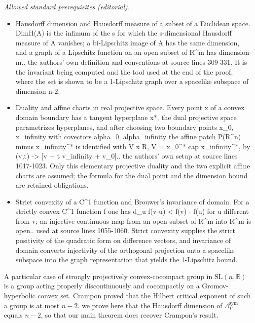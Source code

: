 \documentclass[10pt,a4paper]{amsart}
\newcommand{\sym}{\mathrm{sym}}
\theoremstyle{definition}
\newcommand{\R}{\mathbb{R}}
\newcommand{\SL}{\mathrm{SL}}
\begin{document}
\noindent\textit{Allowed standard prerequisites (editorial).}\begin{itemize}
\item Hausdorff dimension and Hausdorff measure of a subset of a Euclidean space. DimH(A) is the infimum of the s for which the s-dimensional Hausdorff measure of A vanishes; a bi-Lipschitz image of A has the same dimension, and a graph of a Lipschitz function on an open subset of R\textasciicircum{}m has dimension m.. the authors' own definition and conventions at source lines 309-331. It is the invariant being computed and the tool used at the end of the proof, where the set is shown to be a 1-Lipschitz graph over a spacelike subspace of dimension n-2.
\item Duality and affine charts in real projective space. Every point x of a convex domain boundary has a tangent hyperplane x*, the dual projective space parametrizes hyperplanes, and after choosing two boundary points x\_0, x\_infinity with covectors alpha\_0, alpha\_infinity the affine patch P(R\textasciicircum{}n) minus x\_infinity\textasciicircum{}* is identified with V x R, V = x\_0\textasciicircum{}* cap x\_infinity\textasciicircum{}*, by (v,t) -> [v + t v\_infinity + v\_0].. the authors' own setup at source lines 1017-1023. Only this elementary projective duality and the two explicit affine charts are assumed; the formula for the dual point and the dimension bound are retained obligations.
\item Strict convexity of a C\textasciicircum{}1 function and Brouwer's invariance of domain. For a strictly convex C\textasciicircum{}1 function f one has d\_u f(v-u) < f(v) - f(u) for u different from v; an injective continuous map from an open subset of R\textasciicircum{}m into R\textasciicircum{}m is open.. used at source lines 1055-1060. Strict convexity supplies the strict positivity of the quadratic form on difference vectors, and invariance of domain converts injectivity of the orthogonal projection onto a spacelike subspace into the graph representation that yields the 1-Lipschitz bound.
\end{itemize}\medskip
A particular case of strongly projectively convex-cocompact group in $\SL(n,\R)$ is a group acting properly discontinuously and cocompactly on a Gromov-hyperbolic convex set. Crampon proved that the Hilbert critical exponent of such a group is at most $n-2$. we prove here that the Hausdorff dimension of $\Lambda_\Gamma^{\sym}$ equals $n-2$, so that our main theorem does recover Crampon's result.
\end{document}
